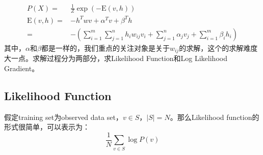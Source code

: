 \documentclass[a4paper]{article}
\begin{document}
\begin{equation}
    \begin{split}
        P(X) 
        = &  \frac{1}{Z} \exp (-\mathrm{E}(v,h)) \\
    \mathrm{E}(v,h) = & - h^T w v + \alpha^T v + \beta^T h \\
    = & - \left( \sum_{i=1}^m \sum_{j=1}^n h_iw_{ij}v_i + \sum_{j=1}^n \alpha_j v_j + \sum_{i=1}^m \beta_i h_i 
    \right)
    \end{split}
\end{equation}
其中，$\alpha$和$\beta$都是一样的，我们重点的关注对象是关于$w_{ij}$的求解，这个的求解难度大一点。求解过程分为两部分，求Likelihood Function和Log Likelihood Gradient。

\subsection{Likelihood Function}
假定training set为observed data set，$v\in S$，$|S|=N$。那么Likelihood function的形式很简单，可以表示为：
\begin{equation}
    \frac{1}{N} \sum_{v\in S} \log P(v)
\end{equation}
\end{document}
